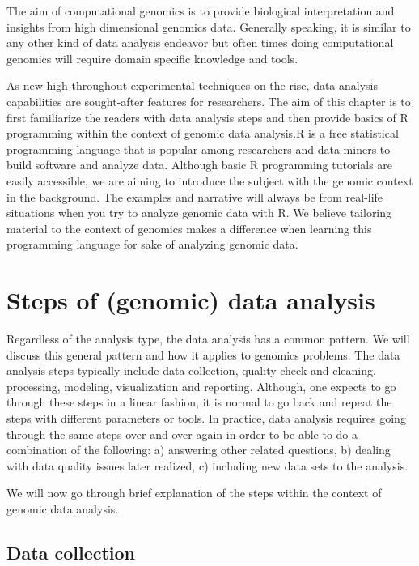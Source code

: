 \documentclass[12pt,]{krantz}
\theoremstyle{definition}
\theoremstyle{definition}
\theoremstyle{definition}
\theoremstyle{remark}
\begin{document}
The aim of computational genomics is to provide biological
interpretation and insights from high dimensional genomics data.
Generally speaking, it is similar to any other kind of data analysis
endeavor but often times doing computational genomics will require
domain specific knowledge and tools.

As new high-throughout experimental techniques on the rise, data
analysis capabilities are sought-after features for researchers. The aim
of this chapter is to first familiarize the readers with data analysis
steps and then provide basics of R programming within the context of
genomic data analysis.R is a free statistical programming language that
is popular among researchers and data miners to build software and
analyze data. Although basic R programming tutorials are easily
accessible, we are aiming to introduce the subject with the genomic
context in the background. The examples and narrative will always be
from real-life situations when you try to analyze genomic data with R.
We believe tailoring material to the context of genomics makes a
difference when learning this programming language for sake of analyzing
genomic data.

\hypertarget{steps-of-genomic-data-analysis}{%
\section{Steps of (genomic) data
analysis}\label{steps-of-genomic-data-analysis}}

Regardless of the analysis type, the data analysis has a common pattern.
We will discuss this general pattern and how it applies to genomics
problems. The data analysis steps typically include data collection,
quality check and cleaning, processing, modeling, visualization and
reporting. Although, one expects to go through these steps in a linear
fashion, it is normal to go back and repeat the steps with different
parameters or tools. In practice, data analysis requires going through
the same steps over and over again in order to be able to do a
combination of the following: a) answering other related questions, b)
dealing with data quality issues later realized, c) including new data
sets to the analysis.

We will now go through brief explanation of the steps within the context
of genomic data analysis.

\hypertarget{data-collection}{%
\subsection{Data collection}\label{data-collection}}
\end{document}
